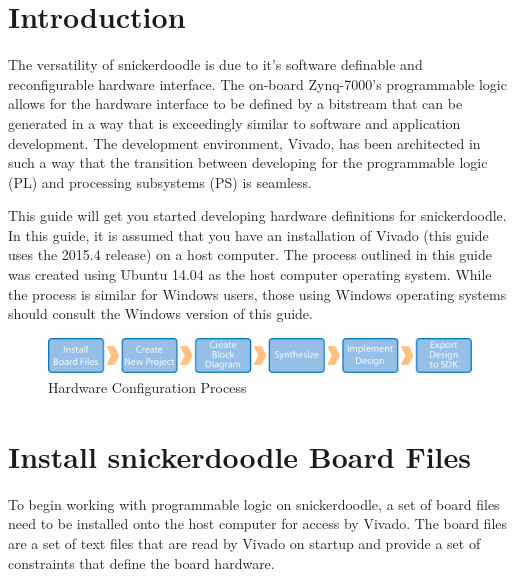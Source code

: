 \section{Introduction}
The versatility of snickerdoodle is due to it's software definable and reconfigurable hardware interface. The on-board Zynq-7000's programmable logic allows for the hardware interface to be defined by a bitstream that can be generated in a way that is exceedingly similar to software and application development. The development environment, Vivado\textregistered, has been architected in such a way that the transition between developing for the programmable logic (PL) and processing subsystems (PS) is seamless. \\



\noindent
This guide will get you started developing hardware definitions for snickerdoodle. In this guide, it is assumed that you have an installation of Vivado (this guide uses the 2015.4 release) on a host computer. The process outlined in this guide was created using Ubuntu 14.04 as the host computer operating system. While the process is similar for Windows users, those using Windows operating systems should consult the Windows version of this guide. \\



\begin{figure}
	\centering
	\includegraphics{images/Hardware_Process.pdf}
	\caption{Hardware Configuration Process}
	\label{fig:hardwareconfigprocess}
\end{figure}



\section{Install snickerdoodle Board Files}
To begin working with programmable logic on snickerdoodle, a set of board files need to be installed onto the host computer for access by Vivado. The board files are a set of text files that are read by Vivado on startup and provide a set of constraints that define the board hardware. \\

